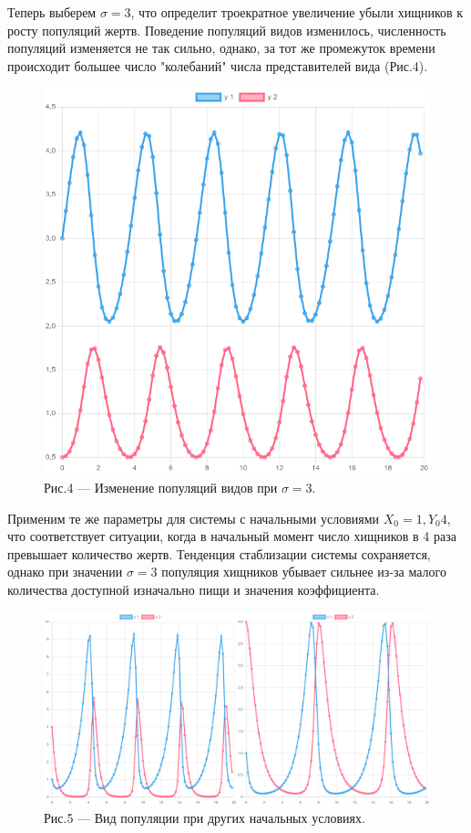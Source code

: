 \documentclass[a4paper,12pt]{article}
\begin{document}
Теперь выберем $\sigma = 3$, что определит троекратное увеличение убыли хищников
к росту популяций жертв. Поведение популяций видов изменилось, численность популяций изменяется не так сильно,
однако, за тот же промежуток времени происходит большее число "колебаний" числа представителей вида (Рис.4).
\begin{figure}[h]
    \centering
    \includegraphics[width=0.5\linewidth]{pictures/task2.png}
    \captionsetup{labelformat=empty}
    \caption{Рис.4 --- Изменение популяций видов при $\sigma = 3$.}
\end{figure}

Применим те же параметры для системы с начальными условиями $X_0 = 1, Y_0 4$, что соответствует 
ситуации, когда в начальный момент число хищников в 4 раза превышает количество жертв.
Тенденция стаблизации системы сохраняется, однако при значении $\sigma = 3$ популяция 
хищников убывает сильнее из-за малого количества доступной изначально пищи и значения коэффициента.
\begin{figure}[h]
    \centering
    \includegraphics[width=0.8\linewidth]{pictures/task3.png}
    \captionsetup{labelformat=empty}
    \caption{Рис.5 --- Вид популяции при других начальных условиях.}
\end{figure}
\newpage
\end{document}

